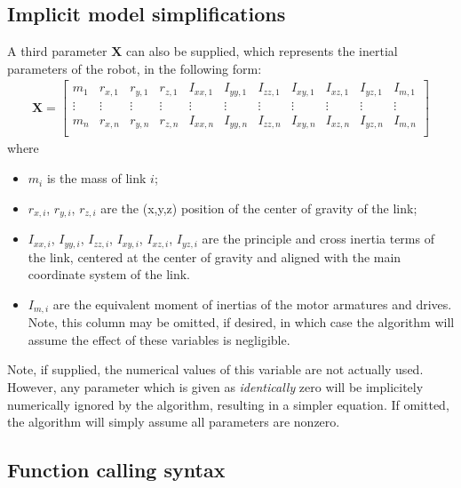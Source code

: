 \documentclass[12pt]{article}
\renewcommand{\b}[1]{\mathbf{#1}}
\begin{document}
\subsection{Implicit model simplifications}
A third parameter $\mathbf{X}$ can also be supplied, which represents the inertial parameters of the robot, in the following form:
\begin{align}
	\b{X} = \begin{bmatrix}
		m_1 & r_{x,1} & r_{y,1} & r_{z,1} & I_{xx,1} & I_{yy,1} & I_{zz,1} & I_{xy,1} & I_{xz,1} & I_{yz,1} & I_{m,1}\\
		\vdots &\vdots &\vdots &\vdots &\vdots &\vdots&\vdots&\vdots&\vdots&\vdots&\vdots\\
		m_n & r_{x,n} & r_{y,n} & r_{z,n} & I_{xx,n} & I_{yy,n} & I_{zz,n} & I_{xy,n} & I_{xz,n} & I_{yz,n} & I_{m,n}\\
	\end{bmatrix}
\end{align}
where
\begin{itemize}[itemsep=0pt]
	\item $m_i$ is the mass of link $i$;
	\item $r_{x,i}$, $r_{y,i}$, $r_{z,i}$ are the (x,y,z) position of the center of gravity of the link;
	\item $I_{xx,i}$, $I_{yy,i}$, $I_{zz,i}$, $I_{xy,i}$, $I_{xz,i}$, $I_{yz,i}$ are the principle and cross inertia terms of the link, centered at the center of gravity and aligned with the main coordinate system of the link.
	\item $I_{m,i}$ are the equivalent moment of inertias of the motor armatures and drives. Note, this column may be omitted, if desired, in which case the algorithm will assume the effect of these variables is negligible.
\end{itemize}
Note, if supplied, the numerical values of this variable are not actually used. However, any parameter which is given as \textit{identically} zero will be implicitely numerically ignored by the algorithm, resulting in a simpler equation. If omitted, the algorithm will simply assume all parameters are nonzero.

\subsection{Function calling syntax}
\end{document}

